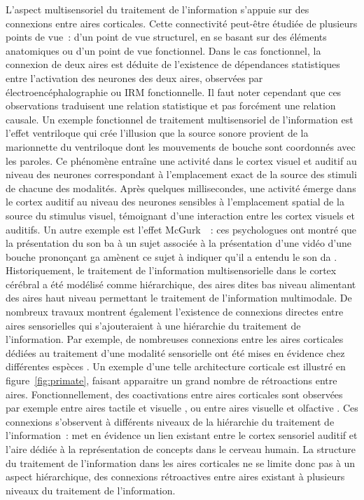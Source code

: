 \documentclass[../main]{subfiles}
\begin{document}
L'aspect multisensoriel du traitement de l'information s'appuie sur des connexions entre aires corticales.
Cette connectivité peut-être étudiée de plusieurs points de vue~: d'un point de vue structurel, en se basant sur des éléments anatomiques ou d'un point de vue fonctionnel.
Dans le cas fonctionnel, la connexion de deux aires est déduite de l'existence de dépendances statistiques entre l'activation des neurones des deux aires, observées par électroencéphalographie ou IRM fonctionnelle. Il faut noter cependant que ces observations traduisent une relation statistique et pas forcément une relation causale. 
Un exemple fonctionnel de traitement multisensoriel de l'information est l'effet ventriloque \parencite{Bonath2007NeuralBO} qui crée l'illusion que la source sonore provient de la marionnette du ventriloque dont les mouvements de bouche sont coordonnés avec les paroles. 
Ce phénomène entraîne une activité dans le cortex visuel et auditif au niveau des neurones correspondant à l'emplacement exact de la source des stimuli de chacune des modalités.
Après quelques millisecondes, une activité émerge dans le cortex auditif au niveau des neurones sensibles à l'emplacement spatial de la source du stimulus visuel, témoignant d'une interaction entre les cortex visuels et auditifs.
Un autre exemple est l'effet McGurk~\parencite{McGurk1976HearingLA}~: ces psychologues ont montré que la présentation du son \og ba \fg{} à un sujet associée à la présentation d'une vidéo d'une bouche prononçant \og ga \fg{} amènent ce sujet à indiquer qu'il a entendu le son \og da \fg{}.
Historiquement, le traitement de l'information multisensorielle dans le cortex cérébral a été modélisé comme hiérarchique, des aires dites bas niveau alimentant des aires haut niveau permettant le traitement de l'information multimodale. 
De nombreux travaux montrent également l'existence de connexions directes entre aires sensorielles qui s'ajouteraient à une hiérarchie du traitement de l'information. Par exemple, de nombreuses connexions entre les aires corticales dédiées au traitement d'une modalité sensorielle ont été mises en évidence chez différentes espèces \parencite{primate_cortex_91,Calvert2004MultisensoryIM, Cappe2009MultisensoryAP,Foxe2005TheCF,Schroeder2005MultisensoryCT}. Un exemple d'une telle architecture corticale est illustré en figure~\ref{fig:primate}, faisant apparaitre un grand nombre de rétroactions entre aires.
Fonctionnellement, des coactivations entre aires corticales sont observées par exemple entre aires tactile et visuelle \parencite{Sathian2002FeelingWT}, ou entre aires visuelle et olfactive \parencite{Gonzlez2006ReadingCA}.
Ces connexions s'observent à différents niveaux de la hiérarchie du traitement de l'information~: \cite{Kiefer2008TheSO} met en évidence un lien existant entre le cortex sensoriel auditif et l'aire dédiée à la représentation de concepts dans le cerveau humain.
La structure du traitement de l'information dans les aires corticales ne se limite donc pas à un aspect hiérarchique, des connexions rétroactives entre aires existant à plusieurs niveaux du traitement de l'information.
\end{document}
